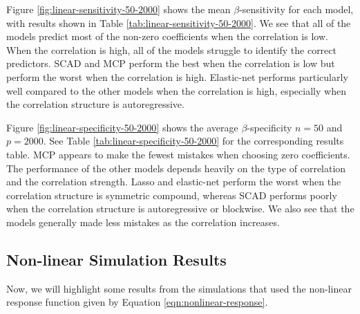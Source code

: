 \documentclass{article}
\begin{document}
	Figure \ref{fig:linear-sensitivity-50-2000} shows the mean $\beta$-sensitivity for each model, with results shown in Table \ref{tab:linear-sensitivity-50-2000}. We see that all of the models predict most of the non-zero coefficients when the correlation is low. When the correlation is high, all of the models struggle to identify the correct predictors. SCAD and MCP perform the best when the correlation is low but perform the worst when the correlation is high. Elastic-net performs particularly well compared to the other models when the correlation is high, especially when the correlation structure is autoregressive.
	
	Figure \ref{fig:linear-specificity-50-2000} shows the average $\beta$-specificity $n = 50$ and $p = 2000$. See Table \ref{tab:linear-specificity-50-2000} for the corresponding results table. MCP appears to make the fewest mistakes when choosing zero coefficients. The performance of the other models depends heavily on the type of correlation and the correlation strength. Lasso and elastic-net perform the worst when the correlation structure is symmetric compound, whereas SCAD performs poorly when the correlation structure is autoregressive or blockwise. We also see that the models generally made less mistakes as the correlation increases.
	
	\subsection{Non-linear Simulation Results}
	Now, we will highlight some results from the simulations that used the non-linear response function given by Equation \ref{eqn:nonlinear-response}.
	
\end{document}
